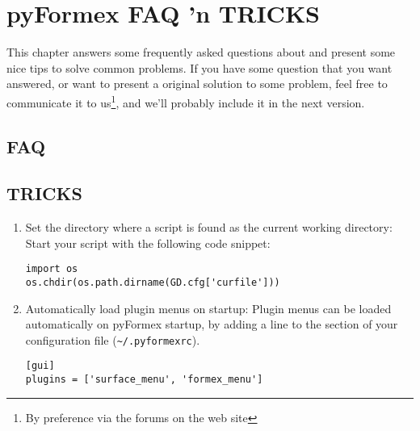 
\chapter{pyFormex FAQ 'n TRICKS}
\label{cha:faq}

This chapter answers some frequently asked questions about \pyformex and present some nice tips to solve common problems. If you have some question that you want answered, or want to present a original solution to some problem, feel free to communicate it to us\footnote{By preference via the forums on the \pyformex web site}, and we'll probably include it in the next version.  

\section{FAQ}
\label{Sec:faq}

\section{TRICKS}
\label{sec:tricks}

\begin{enumerate}
\item Set the directory where a script is found as the current working directory:
Start your script with the following code snippet:
\begin{verbatim}
import os
os.chdir(os.path.dirname(GD.cfg['curfile']))
\end{verbatim}

\item Automatically load plugin menus on startup:
Plugin menus can be loaded automatically on pyFormex startup, by adding a line to the  section of your configuration file (\verb|~/.pyformexrc|).
\begin{verbatim}
[gui]
plugins = ['surface_menu', 'formex_menu']
\end{verbatim}

\end{enumerate}


